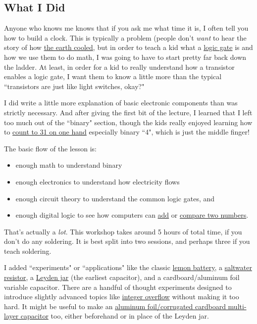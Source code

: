 \subsection*{What I Did}
Anyone who knows me knows that if you ask me what time it is, I often tell you how to build a clock. This is typically a problem (people don't \emph{want} to hear the story of how {\color{webblue}\href{http://www.imdb.com/title/tt0083530/quotes#qt1422044}{the earth cooled}}, but in order to teach a kid what a {\color{webblue}\href{https://en.wikipedia.org/wiki/Logic_gate}{logic gate}} is and how we use them to do math, I was going to have to start pretty far back down the ladder. At least, in order for a kid to really understand how a transistor enables a logic gate, I want them to know a little more than the typical ``transistors are just like light switches, okay?"

I did write a little more explanation of basic electronic components than was strictly necessary. And after giving the first bit of the lecture, I learned that I left too much out of the ``binary" section, though the kids really enjoyed learning how to {\color{webblue}\href{https://en.wikipedia.org/wiki/Finger_binary}{count to 31 on one hand}} especially binary ``4", which is just the middle finger!

The basic flow of the lesson is:
\begin{itemize}
\item enough math to understand binary
\item enough electronics to understand how electricity flows
\item enough circuit theory to understand the common logic gates, and
\item enough digital logic to see how computers can {\color{webblue}\href{https://en.wikipedia.org/wiki/Adder_(electronics)}{add}} or {\color{webblue}\href{https://en.wikipedia.org/wiki/XNOR_gate}{compare two numbers}}.
\end{itemize} 

That's actually a \emph{lot}. This workshop takes around 5 hours of total time, if you don't do any soldering.
It is best split into two sessions, and perhaps three if you teach soldering.


I added ``experiments" or ``applications" like the classic {\color{webblue}\href{https://en.wikipedia.org/wiki/Lemon_battery}{lemon battery}}, a {\color{webblue}\href{https://en.wikipedia.org/wiki/Liquid_rheostat}{saltwater resistor}}, a {\color{webblue}\href{https://en.wikipedia.org/wiki/Leyden_jar}{Leyden jar}} (the earliest capacitor), and a cardboard/aluminum foil variable capacitor. There are a handful of thought experiments designed to introduce slightly advanced topics like {\color{webblue}\href{https://en.wikipedia.org/wiki/Integer_overflow}{integer overflow}} without making it too hard. It might be useful to make an {\color{webblue}\href{http://bizarrelabs.com/crystal.htm}{aluminum foil/corrugated cardboard multi-layer capacitor}} too, either beforehand or in place of the Leyden jar.


